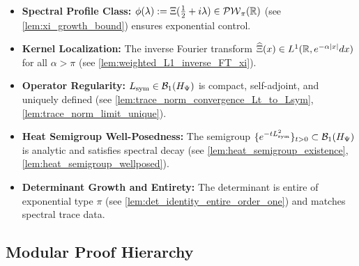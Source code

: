 \begin{itemize}
  \item \textbf{Spectral Profile Class:} \( \phi(\lambda) := \Xi(\tfrac{1}{2} + i\lambda) \in \mathcal{PW}_{\pi}(\mathbb{R}) \) (see \cref{lem:xi_growth_bound}) ensures exponential control.

  \item \textbf{Kernel Localization:} The inverse Fourier transform \( \widehat{\Xi}(x) \in L^1(\mathbb{R}, e^{-\alpha |x|} dx) \) for all \( \alpha > \pi \) (see \cref{lem:weighted_L1_inverse_FT_xi}).

  \item \textbf{Operator Regularity:} \( L_{\mathrm{sym}} \in \mathcal{B}_1(H_{\Psi}) \) is compact, self-adjoint, and uniquely defined (see \cref{lem:trace_norm_convergence_Lt_to_Lsym}, \cref{lem:trace_norm_limit_unique}).

  \item \textbf{Heat Semigroup Well-Posedness:} The semigroup \( \{ e^{-tL_{\mathrm{sym}}^2} \}_{t > 0} \subset \mathcal{B}_1(H_{\Psi}) \) is analytic and satisfies spectral decay (see \cref{lem:heat_semigroup_existence}, \cref{lem:heat_semigroup_wellposed}).

  \item \textbf{Determinant Growth and Entirety:} The determinant is entire of exponential type \( \pi \) (see \cref{lem:det_identity_entire_order_one}) and matches spectral trace data.
\end{itemize}

\subsection*{Modular Proof Hierarchy}

